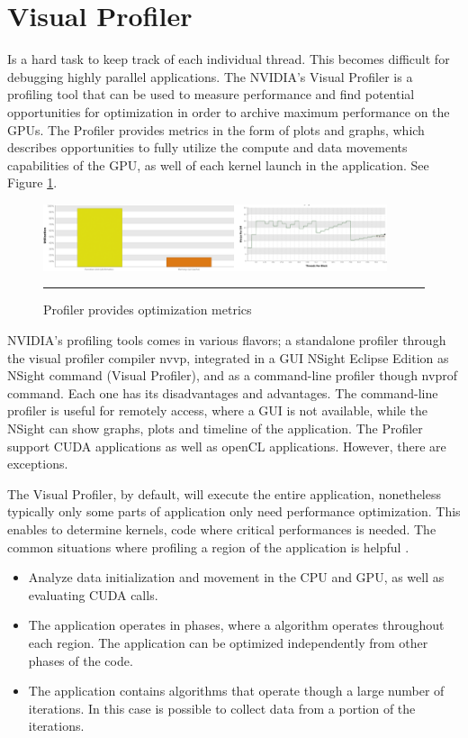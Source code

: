 \section{Visual Profiler}

Is a hard task to keep track of each individual thread. This becomes difficult for debugging highly parallel applications. The NVIDIA's Visual Profiler is a profiling tool that can be used to measure performance and find potential opportunities for optimization in order to archive maximum performance on the GPUs. The Profiler provides metrics in the form of plots and graphs, which describes opportunities to fully utilize the compute and data movements capabilities of the GPU, as well of each kernel launch in the application. See Figure \ref{fig:visualgraph}.

\begin{figure}[htbp]
	\centering
		\includegraphics[width=0.9\textwidth]{Figures/visualgraph.png}
		\rule{35em}{0.2pt}
	\caption[Visual Profiler metrics graphs and plots]{Profiler provides optimization metrics}
	\label{fig:visualgraph}
\end{figure}

NVIDIA's profiling tools comes in various flavors; a standalone profiler through the visual profiler compiler nvvp, integrated in a GUI NSight Eclipse Edition as NSight command (Visual Profiler), and as a command-line profiler though nvprof command. Each one has its disadvantages and advantages. The command-line profiler is useful for remotely access, where a GUI is not available, while the NSight can show graphs, plots and timeline of the application. The Profiler support CUDA applications as well as openCL applications. However, there are exceptions. 

The Visual Profiler, by default, will execute the entire application, nonetheless typically only some parts of application only need performance optimization. This enables to determine kernels, code where critical performances is needed. The common situations where profiling a region of the application is helpful \cite{tool}.

\begin{itemize}
  \item Analyze data initialization and movement in the CPU and GPU, as well as evaluating CUDA calls.
  \item The application operates in phases, where a algorithm operates throughout each region. The application can be optimized independently from other phases of the code.
  \item The application contains algorithms that operate though a large number of iterations. In this case is possible to collect data from a portion of the iterations.
\end{itemize}

